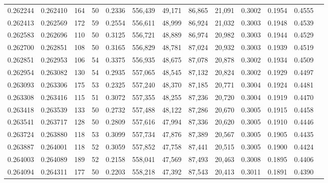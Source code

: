 \begin{tabular}{rrrrrrrrrrrrr}
0.262244 & 0.262410 &   164 &  50 &                                     0.2336 & 556,439 &  49,171 &  86,865 &  21,091 & 0.3002 & 0.1954 & 0.4555 \\
0.262413 & 0.262569 &   172 &  59 &                                     0.2554 & 556,611 &  48,999 &  86,924 &  21,032 & 0.3003 & 0.1948 & 0.4539 \\
0.262583 & 0.262696 &   110 &  50 &                                     0.3125 & 556,721 &  48,889 &  86,974 &  20,982 & 0.3003 & 0.1944 & 0.4529 \\
0.262700 & 0.262851 &   108 &  50 &                                     0.3165 & 556,829 &  48,781 &  87,024 &  20,932 & 0.3003 & 0.1939 & 0.4519 \\
0.262851 & 0.262953 &   106 &  54 &                                     0.3375 & 556,935 &  48,675 &  87,078 &  20,878 & 0.3002 & 0.1934 & 0.4509 \\
0.262954 & 0.263082 &   130 &  54 &                                     0.2935 & 557,065 &  48,545 &  87,132 &  20,824 & 0.3002 & 0.1929 & 0.4497 \\
0.263093 & 0.263306 &   175 &  53 &                                     0.2325 & 557,240 &  48,370 &  87,185 &  20,771 & 0.3004 & 0.1924 & 0.4481 \\
0.263308 & 0.263416 &   115 &  51 &                                     0.3072 & 557,355 &  48,255 &  87,236 &  20,720 & 0.3004 & 0.1919 & 0.4470 \\
0.263418 & 0.263539 &   133 &  50 &                                     0.2732 & 557,488 &  48,122 &  87,286 &  20,670 & 0.3005 & 0.1915 & 0.4458 \\
0.263541 & 0.263717 &   128 &  50 &                                     0.2809 & 557,616 &  47,994 &  87,336 &  20,620 & 0.3005 & 0.1910 & 0.4446 \\
0.263724 & 0.263880 &   118 &  53 &                                     0.3099 & 557,734 &  47,876 &  87,389 &  20,567 & 0.3005 & 0.1905 & 0.4435 \\
0.263887 & 0.264001 &   118 &  52 &                                     0.3059 & 557,852 &  47,758 &  87,441 &  20,515 & 0.3005 & 0.1900 & 0.4424 \\
0.264003 & 0.264089 &   189 &  52 &                                     0.2158 & 558,041 &  47,569 &  87,493 &  20,463 & 0.3008 & 0.1895 & 0.4406 \\
0.264094 & 0.264311 &   177 &  50 &                                     0.2203 & 558,218 &  47,392 &  87,543 &  20,413 & 0.3011 & 0.1891 & 0.4390 \\

\end{tabular}
